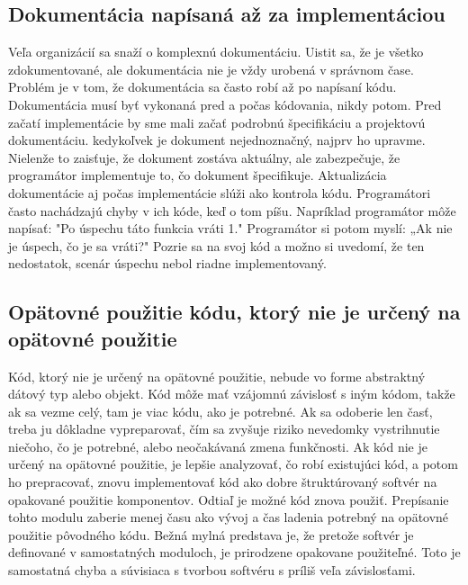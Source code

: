 \documentclass[10pt,twoside,slovak,a4paper]{article}
\begin{document}
\subsection{Dokumentácia napísaná až za implementáciou}
Veľa organizácií sa snaží o komplexnú dokumentáciu.
Uistit sa, že je všetko zdokumentované, ale dokumentácia
nie je vždy urobená v správnom čase. Problém je v tom, že dokumentácia sa často robí až po napísaní kódu.
Dokumentácia musí byť vykonaná pred a počas kódovania,
nikdy potom. Pred začatí implementácie by sme mali začať
podrobnú špecifikáciu a projektovú dokumentáciu. kedykoľvek je dokument nejednoznačný, najprv ho upravme. Nielenže to zaisťuje, že dokument
zostáva aktuálny, ale zabezpečuje, že programátor implementuje to, čo dokument špecifikuje.
Aktualizácia dokumentácie aj počas implementácie
slúži ako kontrola kódu. Programátori často nachádzajú chyby
v ich kóde, keď o tom píšu. Napríklad programátor môže napísať: "Po úspechu táto funkcia vráti 1."
Programátor si potom myslí: „Ak nie je úspech, čo je
sa vráti?" Pozrie sa na svoj kód a možno si uvedomí, že ten nedostatok, scenár úspechu nebol riadne implementovaný.

\subsection{Opätovné použitie kódu, ktorý nie je určený na opätovné použitie}
\cite{25mistakes}
Kód, ktorý nie je určený na opätovné použitie, nebude vo forme
abstraktný dátový typ alebo objekt. Kód môže mať vzájomnú závislosť s iným kódom, takže ak sa vezme celý, tam
je viac kódu, ako je potrebné. Ak sa odoberie len časť, treba ju dôkladne vypreparovať, čím sa zvyšuje riziko nevedomky
vystrihnutie niečoho, čo je potrebné, alebo neočakávaná zmena funkčnosti. Ak kód nie je určený na opätovné použitie, je lepšie analyzovať, čo robí existujúci kód, a potom ho prepracovať, znovu implementovať kód ako dobre štruktúrovaný softvér na opakované použitie
komponentov. Odtiaľ je možné kód znova použiť. Prepísanie tohto modulu zaberie menej času ako vývoj a
čas ladenia potrebný na opätovné použitie pôvodného kódu.
Bežná mylná predstava je, že pretože softvér je
definované v samostatných moduloch, je prirodzene opakovane použiteľné. Toto je
samostatná chyba a súvisiaca s tvorbou softvéru
s príliš veľa závislosťami.
\end{document}
